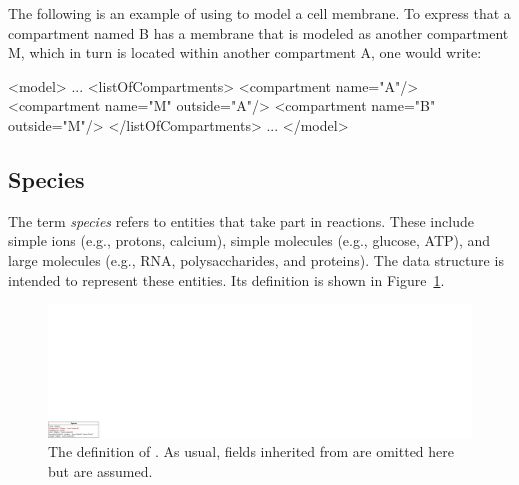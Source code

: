 \documentclass[10pt]{cekarticle}
\newcommand{\vref}[1]{\ref{#1}}
\newenvironment{blockChanged}{\color{BrickRed}}{}
\begin{document}
\begin{blockChanged}
The following is an example of using  to model a cell
membrane.  To express that a compartment named B has a membrane that is
modeled as another compartment M, which in turn is located within another
compartment A, one would write:
\end{blockChanged}
\begin{example}
<model>
    ...
    <listOfCompartments>
        <compartment name="A"/>
        <compartment name="M" outside="A"/>
        <compartment name="B" outside="M"/>
    </listOfCompartments>
    ...
</model>
\end{example}


\subsection{Species}
\label{sec:species}

The term \emph{species} refers to entities that take part in reactions.
These include simple ions (e.g., protons, calcium), simple molecules (e.g.,
glucose, ATP), and large molecules (e.g., RNA, polysaccharides, and
proteins).  The  data structure is intended to represent
these entities.  Its definition is shown in Figure~\vref{fig:species}.

\begin{figure}[htb]
  \centering
  \includegraphics[scale = 0.68]{species}
  \caption{The definition of .  As usual, fields inherited from
     are omitted here but are assumed.}
  \label{fig:species}
\end{figure}
\end{document}
